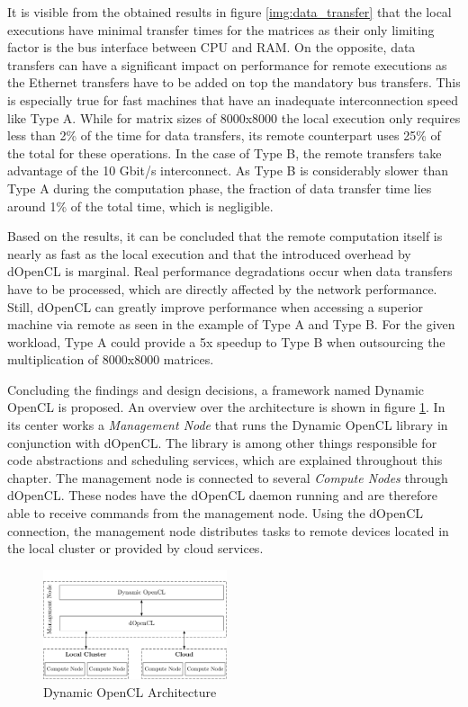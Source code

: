 It is visible from the obtained results in figure \ref{img:data_transfer} that the local executions have minimal transfer times for the matrices as their only limiting factor is the bus interface between CPU and RAM. On the opposite, data transfers can have a significant impact on performance for remote executions as the Ethernet transfers have to be added on top the mandatory bus transfers. This is especially true for fast machines that have an inadequate interconnection speed like Type A. While for matrix sizes of 8000x8000 the local execution only requires less than 2\% of the time for data transfers, its remote counterpart uses 25\% of the total for these operations. In the case of Type B, the remote transfers take advantage of the 10 Gbit/s interconnect. As Type B is considerably slower than Type A during the computation phase, the fraction of data transfer time lies around 1\% of the total time, which is negligible.

Based on the results, it can be concluded that the remote computation itself is nearly as fast as the local execution and that the introduced overhead by dOpenCL is marginal. Real performance degradations occur when data transfers have to be processed, which are directly affected by the network performance. Still, dOpenCL can greatly improve performance when accessing a superior machine via remote as seen in the example of Type A and Type B. For the given workload, Type A could provide a 5x speedup to Type B when outsourcing the multiplication of 8000x8000 matrices.

Concluding the findings and design decisions, a framework named Dynamic OpenCL is proposed. An overview over the architecture is shown in figure \ref{img:dynamic_opencl_arch}. In its center works a \textit{Management Node} that runs the Dynamic OpenCL library in conjunction with dOpenCL. The library is among other things responsible for code abstractions and scheduling services, which are explained throughout this chapter. The management node is connected to several \textit{Compute Nodes} through dOpenCL. These nodes have the dOpenCL daemon running and are therefore able to receive commands from the management node. Using the dOpenCL connection, the management node distributes tasks to remote devices located in the local cluster or provided by cloud services.

\begin{figure}[H]

	\includegraphics[width=0.48\textwidth]{drawings/dynamic_opencl_arch.pdf}
	\centering
	\caption{Dynamic OpenCL Architecture}
	\label{img:dynamic_opencl_arch}
\end{figure}

